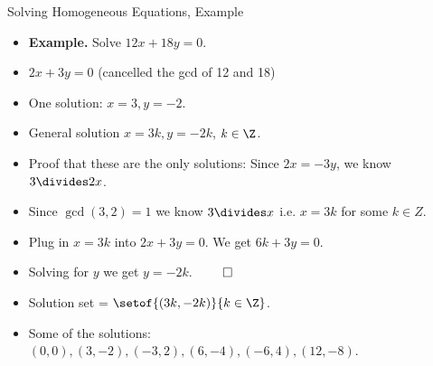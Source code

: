 \documentclass{beamer}
\begin{document}

\begin{frame}{Solving Homogeneous Equations, Example}

\begin{itemize}
  \item \textbf{Example.} Solve $12x + 18y = 0$.
  \item $2x + 3y = 0$  (cancelled the gcd of 12 and 18)
  \item One solution: $x=3, y=-2$.
  \item General solution $x=3k,y=-2k$, $k\in\Z$.
  \item Proof that these are the only solutions: Since $2x = -3y$, we know $3\divides 2x$.
  \item Since $\gcd(3,2)=1$ we know $3\divides x$ i.e. $x=3k$ for some $k\in Z$.
  \item Plug in $x=3k$ into $2x + 3y = 0$. We get $6k + 3y = 0$.
  \item Solving for $y$ we get $y=-2k$. $\qed$
  \item Solution set = $\setof{(3k, -2k)}{k\in\Z}$.
  \item Some of the solutions: $(0,0), (3,-2), (-3, 2), (6, -4), (-6, 4), (12, -8)$.
\end{itemize}

\end{frame}

\end{document}
